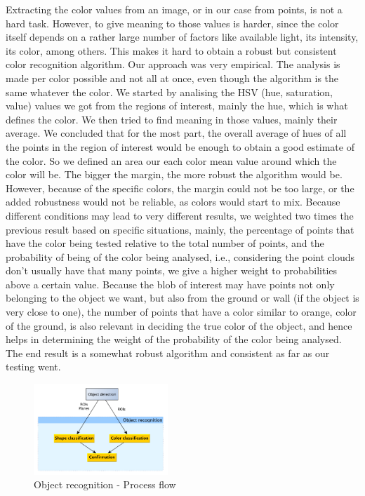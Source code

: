 Extracting the color values from an image, or in our case from points, is not a hard task. 
However, to give meaning to those values is harder, since the color itself depends on a rather large number of factors like available light, its intensity, its color, among others.
This makes it hard to obtain a robust but consistent color recognition algorithm.
Our approach was very empirical. The analysis is made per color possible and not all at once, even though the algorithm is the same whatever the color.
We started by analising the HSV (hue, saturation, value) values we got from the regions of interest, mainly the hue, which is what defines the color. 
We then tried to find meaning in those values, mainly their average.
We concluded that for the most part, the overall average of hues of all the points in the region of interest would be enough to obtain a good estimate of the color. 
So we defined an area our each color mean value around which the color will be.
The bigger the margin, the more robust the algorithm would be.
However, because of the specific colors, the margin could not be too large, or the added robustness would not be reliable, as colors would start to mix.
Because different conditions may lead to very different results, we weighted two times the previous result based on specific situations, mainly, the percentage of points that have the color being tested relative to the total number of points, and the probability of being of the color being analysed, i.e., considering the point clouds don't usually have that many points, we give a higher weight to probabilities above a certain value.
Because the blob of interest may have points not only belonging to the object we want, but also from the ground or wall (if the object is very close to one), the number of points that have a color similar to orange, color of the ground, is also relevant in deciding the true color of the object, and hence helps in determining the weight of the probability of the color being analysed.
The end result is a somewhat robust algorithm and consistent as far as our testing went. 

\begin{figure}
\begin{center}
\includegraphics[width=0.45\textwidth]{figures/arch_vision_obj_rec.pdf}
\end{center}
\caption{Object recognition - Process flow}
\label{fig:vision:obj_rec}
\end{figure}